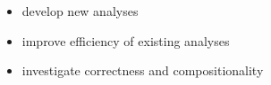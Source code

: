 \begin{frame}{}
\begin{mycolumns}
{
			\vspace*{-4ex}
			\begin{itemize}
				\item develop new analyses
				\item improve efficiency of existing analyses
				\item investigate correctness and compositionality
			\end{itemize}
		}
	\end{mycolumns}
\end{frame}